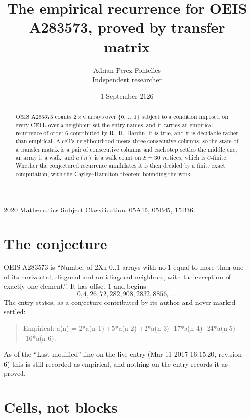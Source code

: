 \documentclass[11pt,a4paper]{article}
\title{The empirical recurrence for OEIS A283573, proved by transfer matrix}
\author{Adrian Perez Fontelles\\ \small Independent researcher}
\date{1 September 2026}
\theoremstyle{plain}
\theoremstyle{definition}
\begin{document}
\maketitle

\begin{abstract}
OEIS A283573 counts $2\times n$ arrays over $\{0,\dots,1\}$ subject to a condition imposed on
every CELL over a neighbour set the entry names, and it carries an empirical recurrence of
order $6$ contributed by R.~H.~Hardin. It is true, and it is decidable rather than
empirical. A cell's neighbourhood meets three consecutive columns, so the state of a transfer
matrix is a pair of consecutive columns and each step settles the middle one; an array is a
walk, and $a(n)$ is a walk count on $S=30$ vertices, which is $C$-finite. Whether the
conjectured recurrence annihilates it is then decided by a finite exact computation, with the
Cayley--Hamilton theorem bounding the work.
\end{abstract}

\noindent\small 2020 Mathematics Subject Classification. 05A15, 05B45, 15B36.\normalsize

\section{The conjecture}

OEIS A283573 is ``Number of 2Xn 0..1 arrays with no 1 equal to more than one of its horizontal, diagonal and antidiagonal neighbors, with the exception of exactly one element.''. It has offset $1$ and begins
\[
0, 4, 26, 72, 282, 908, 2832, 8856,\ \dots
\]
The entry states, as a conjecture contributed by its author and never marked settled:
\begin{quote}
Empirical: a(n) = 2*a(n-1) +5*a(n-2) +2*a(n-3) -17*a(n-4) -24*a(n-5) -16*a(n-6).
\end{quote}
As of the ``Last modified'' line on the live entry (Mar 11 2017 16:15:20, revision 6) this is still
recorded as empirical, and nothing on the entry records it as proved.

\section{Cells, not blocks}
\end{document}
